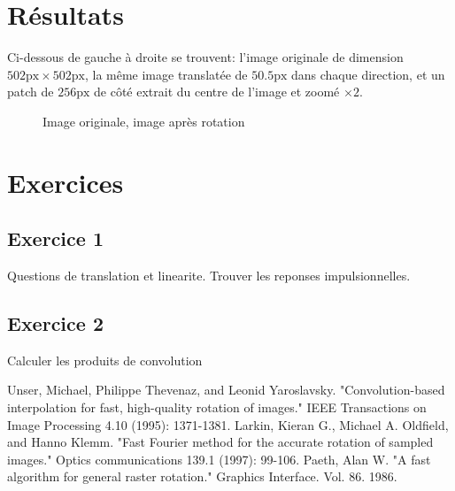 \documentclass[12pt]{article}
\begin{document}
\section*{Résultats}
Ci-dessous de gauche à droite se trouvent: l'image originale de dimension $502\text{px} \times 502 \text{px}$, la même image translatée de $50.5 \text{px}$ dans chaque direction, et un patch de $256\text{px}$ de côté extrait du centre de l'image et zoomé $\times 2$.

\begin{figure}[h]
  \caption{Image originale, image après rotation}
\end{figure}

\section*{Exercices}
\subsection{Exercice 1}
Questions de translation et linearite. \newline
Trouver les reponses impulsionnelles. \newline
\subsection{Exercice 2}
Calculer les produits de convolution

\begin{thebibliography}{2}

  Unser, Michael, Philippe Thevenaz, and Leonid Yaroslavsky. 
  "Convolution-based interpolation for fast, high-quality rotation of images." 
  IEEE Transactions on Image Processing 4.10 (1995): 1371-1381.
  Larkin, Kieran G., Michael A. Oldfield, and Hanno Klemm. 
  "Fast Fourier method for the accurate rotation of sampled images." 
  Optics communications 139.1 (1997): 99-106.
	Paeth, Alan W. 
	"A fast algorithm for general raster rotation." 
	Graphics Interface. Vol. 86. 1986.

\end{thebibliography}
\end{document}
